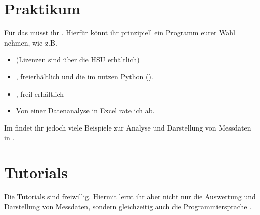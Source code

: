 \documentclass[letterpaper,10pt,english]{jupyterBook}
\begin{document}
\section{Praktikum}
\label{\detokenize{content/00_jupyter:praktikum}}
\sphinxAtStartPar
Für das  müsst ihr {\hyperref[\detokenize{content/1_Datenanalyse::doc}]{}}. Hierfür könnt ihr prinzipiell ein Programm eurer Wahl nehmen, wie z.B.
\begin{itemize}
\item {} 
\sphinxAtStartPar
{} (Lizenzen sind über die HSU erhältlich)

\item {} 
\sphinxAtStartPar
{}, frei\sphinxhyphen{}erhältlich und die {\hyperref[\detokenize{content/T_Tutorials::doc}]{}} im  nutzen Python ().

\item {} 
\sphinxAtStartPar
{}, freil erhältlich

\item {} 
\sphinxAtStartPar
Von einer Datenanalyse in Excel rate ich ab.

\end{itemize}

\sphinxAtStartPar
Im  findet ihr jedoch viele Beispiele zur Analyse und Darstellung von Messdaten in .


\section{Tutorials}
\label{\detokenize{content/00_jupyter:tutorials}}
\sphinxAtStartPar
Die Tutorials sind freiwillig. Hiermit lernt ihr aber nicht nur die Auswertung und Darstellung von Messdaten, sondern gleichzeitig auch die Programmiersprache .
\end{document}
